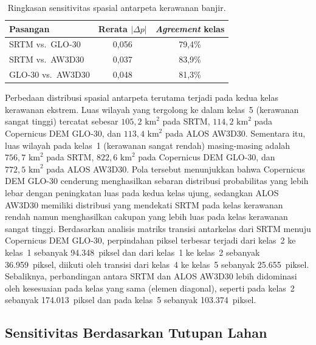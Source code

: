 \documentclass[12pt]{article}
\begin{document}
\begin{table}[ht]
\centering
\caption{Ringkasan sensitivitas spasial antarpeta kerawanan banjir.}
\label{tab:sensitivitas}
\begin{tabular}{lcc}
\toprule
\textbf{Pasangan} & \textbf{Rerata $|\Delta p|$} & \textbf{\textit{Agreement} kelas} \\
\midrule
SRTM vs.\ GLO-30   & 0,056 & 79,4\% \\
SRTM vs.\ AW3D30   & 0,037 & 83,9\% \\
GLO-30 vs.\ AW3D30 & 0,048 & 81,3\% \\
\bottomrule
\end{tabular}
\end{table}

Perbedaan distribusi spasial antarpeta terutama terjadi pada kedua kelas
kerawanan ekstrem. Luas wilayah yang tergolong ke dalam kelas~5 (kerawanan
sangat tinggi) tercatat sebesar $105{,}2\text{ km}^2$ pada SRTM,
$114{,}2\text{ km}^2$ pada Copernicus DEM GLO-30, dan $113{,}4\text{ km}^2$
pada ALOS AW3D30. Sementara itu, luas wilayah pada kelas~1 (kerawanan sangat
rendah) masing-masing adalah $756{,}7\text{ km}^2$ pada SRTM,
$822{,}6\text{ km}^2$ pada Copernicus DEM GLO-30, dan $772{,}5\text{ km}^2$
pada ALOS AW3D30. Pola tersebut menunjukkan bahwa Copernicus DEM GLO-30
cenderung menghasilkan sebaran distribusi probabilitas yang lebih lebar dengan
peningkatan luas pada kedua kelas ujung, sedangkan ALOS AW3D30 memiliki
distribusi yang mendekati SRTM pada kelas kerawanan rendah namun menghasilkan
cakupan yang lebih luas pada kelas kerawanan sangat tinggi. Berdasarkan
analisis matriks transisi antarkelas dari SRTM menuju Copernicus DEM GLO-30,
perpindahan piksel terbesar terjadi dari kelas~2 ke kelas~1 sebanyak
94.348~piksel dan dari kelas~1 ke kelas~2 sebanyak 36.959~piksel, diikuti oleh
transisi dari kelas~4 ke kelas~5 sebanyak 25.655~piksel. Sebaliknya,
perbandingan antara SRTM dan ALOS AW3D30 lebih didominasi oleh kesesuaian pada
kelas yang sama (elemen diagonal), seperti pada kelas~2 sebanyak
174.013~piksel dan pada kelas~5 sebanyak 103.374~piksel.

\subsection{Sensitivitas Berdasarkan Tutupan Lahan}
\end{document}
